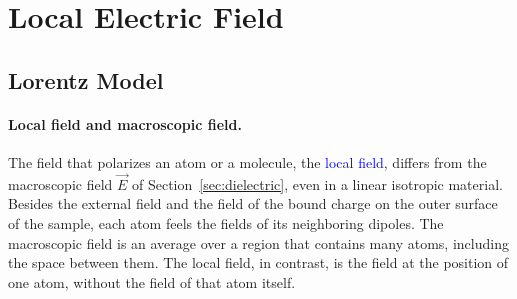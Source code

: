\section{Local Electric Field}
\label{sec:local}

\subsection{Lorentz Model}

\paragraph{Local field and macroscopic field.}
The field that polarizes an atom or a molecule, the \textcolor{blue}{local field}, differs from the macroscopic field $\vec E$ of Section~\ref{sec:dielectric}, even in a linear isotropic material. Besides the external field and the field of the bound charge on the outer surface of the sample, each atom feels the fields of its neighboring dipoles. The macroscopic field is an average over a region that contains many atoms, including the space between them. The local field, in contrast, is the field at the position of one atom, without the field of that atom itself.


